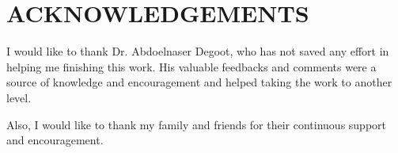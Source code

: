 \chapter*{ACKNOWLEDGEMENTS}
%

 I would like to thank Dr. Abdoelnaser Degoot, who has not saved any effort in helping me finishing this work.  His valuable feedbacks and comments were a source of knowledge and encouragement and helped taking the work to another level.  
  
Also, I would like to thank my family and friends for their continuous support and encouragement.

\
\

\
\
\
\

\

